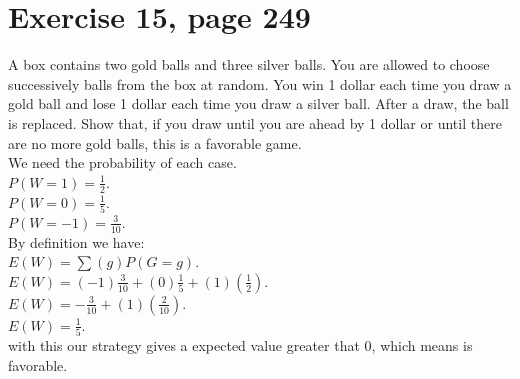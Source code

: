 \documentclass[]{article}
\begin{document}
\section{Exercise 15, page 249}
A box contains two gold balls and three silver balls. You are allowed to choose successively balls from the box at random. You win 1 dollar each time you draw a gold ball and lose 1 dollar each time you draw a silver ball. After a draw, the ball is replaced. Show that, if you draw until you are ahead by 1 dollar or until there are no more gold balls, this is a favorable game.\\
We need the probability of each case.\\
$P(W = 1)  = \frac{1}{2}$.  \\
$P(W = 0)  = \frac{1}{5}$.  \\
$P(W = -1) = \frac{3}{10}$. \\
By definition we have:\\
$E(W) = \sum (g)P(G = g)$. \\
$E(W) = (-1)\frac{3}{10} + (0)\frac{1}{5} + (1)(\frac{1}{2})$. \\
$E(W) = -\frac{3}{10} + (1)(\frac{2}{10})$. \\
$E(W) = \frac{1}{5}$. \\
with this our strategy gives a expected value greater that 0, which means is favorable.
\end{document}
